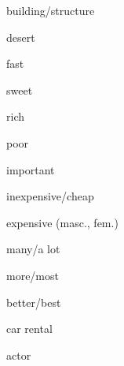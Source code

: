 \begin{flashcard}{\LARGE building/structure}
\LARGE {}
\end{flashcard}
\begin{flashcard}{\LARGE desert}
\LARGE {}
\end{flashcard}
\begin{flashcard}{\LARGE fast}
\LARGE {}
\end{flashcard}
\begin{flashcard}{\LARGE sweet}
\LARGE {}
\end{flashcard}
\begin{flashcard}{\LARGE rich}
\LARGE {}
\end{flashcard}
\begin{flashcard}{\LARGE poor}
\LARGE {}
\end{flashcard}
\begin{flashcard}{\LARGE important}
\LARGE {}
\end{flashcard}
\begin{flashcard}{\LARGE inexpensive/cheap}
\LARGE {}
\end{flashcard}
\begin{flashcard}{\LARGE expensive (masc., fem.)}
\LARGE {}
\end{flashcard}
\begin{flashcard}{\LARGE many/a lot}
\LARGE {}
\end{flashcard}
\begin{flashcard}{\LARGE more/most}
\LARGE {}
\end{flashcard}
\begin{flashcard}{\LARGE better/best}
\LARGE {}
\end{flashcard}
\begin{flashcard}{\LARGE car rental}
\LARGE {}
\end{flashcard}
\begin{flashcard}{\LARGE actor}
\LARGE {}
\end{flashcard}
